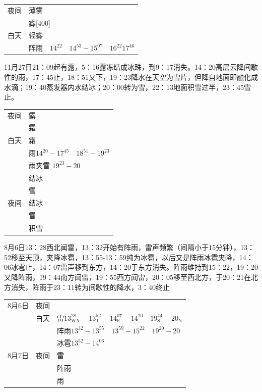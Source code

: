 ﻿\documentclass[UTF8,11pt]{ctexbook}%
\begin{document}
\begin{center}
	\begin{tabular}{cl}
		\hline
		夜间 & 薄雾\\
		 & 雾[400]\\
		\hline
		白天 & 轻雾\bcancel{\(08-08^{09}\)}\\
		 & 阵雨\(\quad14^{22}\quad14^{53}-15^{07}\quad16^{22}17^{46}\)\\
		\hline
	\end{tabular}
\end{center}

11月27日21：09起有露，5：16露冻结成冰珠，到9：17消失。14：20高层云降间歇性的雨，17：45止，18：51又下，19：23降水在天空为雪片，但降自地面即融化成水滴；19：40蒸发器内水结冰；20：00转为雪，22：13地面积雪过半，23：45雪止。

\begin{center}
	\begin{tabular}{cl}
		\hline
		夜间 & 露\\
		 & 霜\\
		\hline
		白天 & 霜\\
		 & 雨\(14^{20}-17^{45}\quad18^{51}-19^{23}\)\\
		 & 雨夹雪 \(19^{23}-20\)\\
		 & 结冰\\
		 & 雪\\
		\hline
		夜间 & 结冰\\
		 & 雪\\
		 & 积雪\\
		\hline
	\end{tabular}
\end{center}	

8月6日13：28西北闻雷，13：32开始有阵雨，雷声频繁（间隔小于15分钟），13：52移至天顶，夹降冰雹，13：55-13：59纯为冰雹，以后又是阵雨冰雹夹降，14：06冰雹止，14：07雷声移到东方，14：20于东方消失。阵雨维持到15：22，19：20又降阵雨，19：44南方闻雷，19：55西方闻雷，20：05移至西北方，于20：21在北方消失，阵雨于23：11转为间歇性的降水，3：40终止

\begin{center}
	\begin{tabular}{ccl}
		\hline
		8月6日 & 夜间 & \\
		 & 白天 & 雷\(13^{28}_\mathrm{WN}-13^{52}_\mathrm{T}-14^{07}_\mathrm{E}-14^{20}\quad19^{44}_\mathrm{S}-20_\mathrm{N}\)\\
		 & & 阵雨\(13^{32}-13^{55}\quad13^{59}-15^{22}\quad19^{20}-20\)\\
		 & & 冰雹\(13^{52}-14^{06}\)\\
		\hline
		8月7日 & 夜间 & 雷\\
		 & & 阵雨\\
		 & & 雨\\
		\hline
	\end{tabular}
\end{center}
\end{document}
